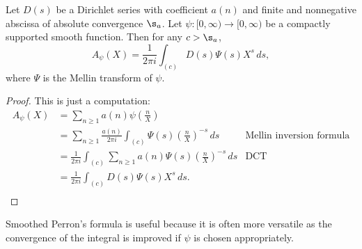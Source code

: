     \begin{theorem}
      Let $D(s)$ be a Dirichlet series with coefficient $a(n)$ and finite and nonnegative abscissa of absolute convergence $\s_{a}$. Let $\psi:[0,\infty) \to [0,\infty)$ be a compactly supported smooth function. Then for any $c > \s_{a}$,
      \[
        A_{\psi}(X) = \frac{1}{2\pi i}\int_{(c)}D(s)\Psi(s)X^{s}\,ds,
      \]
      where $\Psi$ is the Mellin transform of $\psi$.
    \end{theorem}
    \begin{proof}
      This is just a computation:
      \begin{align*}
        A_{\psi}(X) &= \sum_{n \ge 1}a(n)\psi\left(\frac{n}{X}\right) \\
        &= \sum_{n \ge 1}\frac{a(n)}{2\pi i}\int_{(c)}\Psi(s)\left(\frac{n}{X}\right)^{-s}\,ds & \text{Mellin inversion formula} \\
        &= \frac{1}{2\pi i}\int_{(c)}\sum_{n \ge 1}a(n)\Psi(s)\left(\frac{n}{X}\right)^{-s}\,ds & \text{DCT} \\
        &= \frac{1}{2\pi i}\int_{(c)}D(s)\Psi(s)X^{s}\,ds. \\
      \end{align*}
    \end{proof}

    Smoothed Perron's formula is useful because it is often more versatile as the convergence of the integral is improved if $\psi$ is chosen appropriately.
